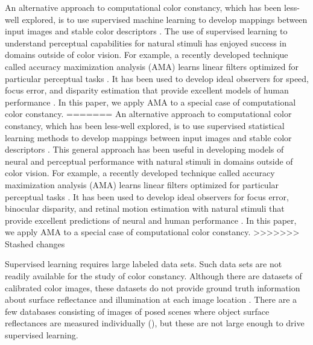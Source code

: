 \documentclass{jov}
\begin{document}
An alternative approach to computational color constancy, which has been less-well explored, is to use supervised machine learning to develop mappings between input images and stable color descriptors \cite{barron2015convolutional}. The use of supervised learning to understand perceptual capabilities for natural stimuli has enjoyed success in domains outside of color vision. For example, a recently developed technique called accuracy maximization analysis (AMA) learns linear filters optimized for particular perceptual tasks \cite{geisler2009optimal}. It has been used to develop ideal observers for speed, focus error, and disparity estimation that provide excellent models of human performance \cite{burge2011optimal, burge2014optimal, burge2015optimal}. In this paper, we apply AMA to a special case of computational color constancy. 
=======
An alternative approach to computational color constancy, which has been less-well explored, is to use supervised statistical learning methods to develop mappings between input images and stable color descriptors \cite{barron2015convolutional}. %
This general approach has been useful in developing models of neural and perceptual performance with natural stimuli in domains outside of color vision.
For example, a recently developed technique called accuracy maximization analysis (AMA) learns linear filters optimized for particular perceptual tasks \cite{geisler2009optimal}. It has been used to develop ideal observers for focus error, binocular disparity, and retinal motion estimation with natural stimuli that provide excellent predictions of neural and human performance \cite{burge2011optimal, burge2014optimal, burge2015optimal}. In this paper, we apply AMA to a special case of computational color constancy. 
>>>>>>> Stashed changes

Supervised learning requires large labeled data sets.  Such data sets are not readily available for the study of color constancy. Although there are datasets of calibrated color images, these datasets do not provide ground truth information about surface reflectance and illumination at each image location \cite{ChakrabartiHyperspectral,NascimentoFoster2016,ParragaHyperspectralData,TkacikUpennHypersepctralData,skauli2013collection,olmos2004biologically}. There are a few databases consisting of images of posed scenes where object surface reflectances are measured individually (), but these are not large enough to drive supervised learning.
 
\end{document}
